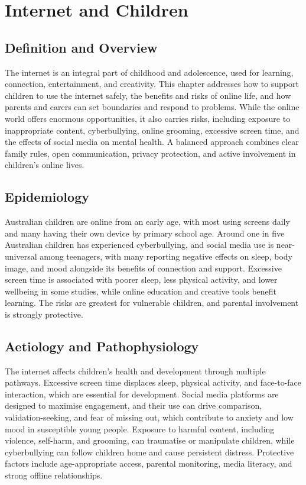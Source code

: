 \chapter{Internet and Children}

\section*{Definition and Overview}
The internet is an integral part of childhood and adolescence, used for learning, connection, entertainment, and creativity. This chapter addresses how to support children to use the internet safely, the benefits and risks of online life, and how parents and carers can set boundaries and respond to problems. While the online world offers enormous opportunities, it also carries risks, including exposure to inappropriate content, cyberbullying, online grooming, excessive screen time, and the effects of social media on mental health. A balanced approach combines clear family rules, open communication, privacy protection, and active involvement in children's online lives.

\section*{Epidemiology}
Australian children are online from an early age, with most using screens daily and many having their own device by primary school age. Around one in five Australian children has experienced cyberbullying, and social media use is near-universal among teenagers, with many reporting negative effects on sleep, body image, and mood alongside its benefits of connection and support. Excessive screen time is associated with poorer sleep, less physical activity, and lower wellbeing in some studies, while online education and creative tools benefit learning. The risks are greatest for vulnerable children, and parental involvement is strongly protective.

\section*{Aetiology and Pathophysiology}
The internet affects children's health and development through multiple pathways. Excessive screen time displaces sleep, physical activity, and face-to-face interaction, which are essential for development. Social media platforms are designed to maximise engagement, and their use can drive comparison, validation-seeking, and fear of missing out, which contribute to anxiety and low mood in susceptible young people. Exposure to harmful content, including violence, self-harm, and grooming, can traumatise or manipulate children, while cyberbullying can follow children home and cause persistent distress. Protective factors include age-appropriate access, parental monitoring, media literacy, and strong offline relationships.

